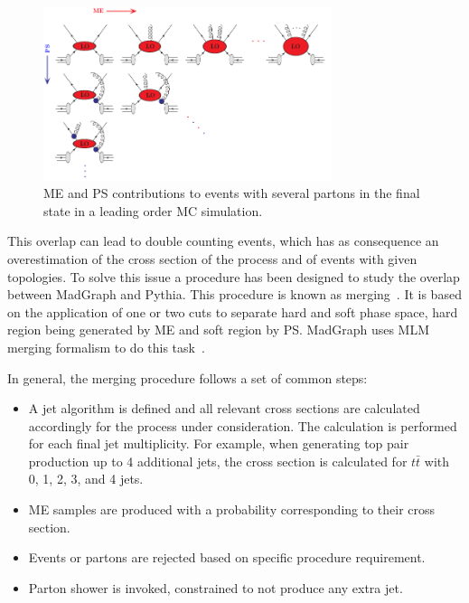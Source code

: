 \begin{figure}[!Hhtbp]
  \begin{center}
    \includegraphics[width=0.75\textwidth]{figs/PSMEInterface.png}
    \caption{ME and PS contributions to events with several partons in the final state in a leading order MC simulation.}
    \label{fig:PSME}
  \end{center}
\end{figure}

This overlap can lead to double counting events, which has as consequence an overestimation of the cross section of the process and of events with given topologies. To solve this issue a procedure has been designed to study the overlap between MadGraph and Pythia. This procedure is known as merging~\cite{Alwall:2007fs, Alwall:2008qv, Lavesson:2007uu}. It is based on the application of one or two cuts to separate hard and soft phase space, hard region being generated by ME and soft region by PS. MadGraph uses MLM merging formalism to do this task~\cite{Mangano:2001xp, Mangano:2006rw}. 

In general, the merging procedure follows a set of common steps:
\begin{itemize}
\item A jet algorithm is defined and all relevant cross sections are calculated accordingly for the process under consideration. The calculation is performed for each final jet multiplicity. For example, when generating top pair production up to 4 additional jets, the cross section is calculated for $t\bar{t}$ with 0, 1, 2, 3, and 4 jets. 
\item ME samples are produced with a probability corresponding to their cross section.
\item Events or partons are rejected based on specific procedure requirement.
\item Parton shower is invoked, constrained to not produce any extra jet.
\end{itemize}


